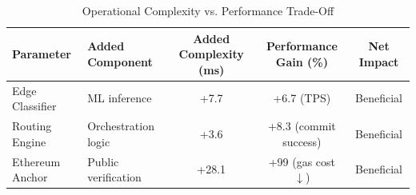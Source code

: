 \begin{table}[htbp]
\centering
\caption{Operational Complexity vs. Performance Trade-Off}
\label{tab:complexity_tradeoff}
\begin{tabular}{llccc}
\toprule
\textbf{Parameter} & \textbf{Added Component} & \textbf{Added Complexity (ms)} & \textbf{Performance Gain (\%)} & \textbf{Net Impact} \\
\midrule
Edge Classifier & ML inference & +7.7 & +6.7 (TPS) & \colorbox{green!20}{Beneficial} \\
Routing Engine & Orchestration logic & +3.6 & +8.3 (commit success) & \colorbox{green!20}{Beneficial} \\
Ethereum Anchor & Public verification & +28.1 & +99 (gas cost $\downarrow$) & \colorbox{green!20}{Beneficial} \\
\bottomrule
\end{tabular}
\end{table}
